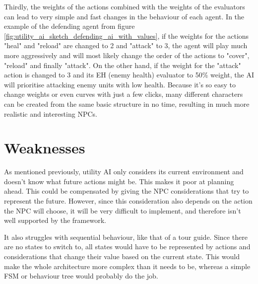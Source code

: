Thirdly, the weights of the actions combined with the weights of the evaluators can lead to very simple and fast changes in the behaviour of each agent. In the example of the defending agent from figure \ref{fig:utility_ai_sketch_defending_ai_with_values}, if the weights for the actions "heal" and "reload" are changed to 2 and "attack" to 3, the agent will play much more aggressively and will most likely change the order of the actions to "cover", "reload" and finally "attack". On the other hand, if the weight for the "attack" action is changed to 3 and its EH (enemy health) evaluator to 50\% weight, the AI will prioritise attacking enemy units with low health. Because it's so easy to change weights or even curves with just a few clicks, many different characters can be created from the same basic structure in no time, resulting in much more realistic and interesting NPCs.

\section{Weaknesses}
\label{sec:utilityai_weaknesses}

As mentioned previously, utility AI only considers its current environment and doesn't know what future actions might be. This makes it poor at planning ahead. This could be compensated by giving the NPC considerations that try to represent the future. However, since this consideration also depends on the action the NPC will choose, it will be very difficult to implement, and therefore isn't well supported by the framework.

It also struggles with sequential behaviour, like that of a tour guide. Since there are no states to switch to, all states would have to be represented by actions and considerations that change their value based on the current state. This would make the whole architecture more complex than it needs to be, whereas a simple FSM or behaviour tree would probably do the job.